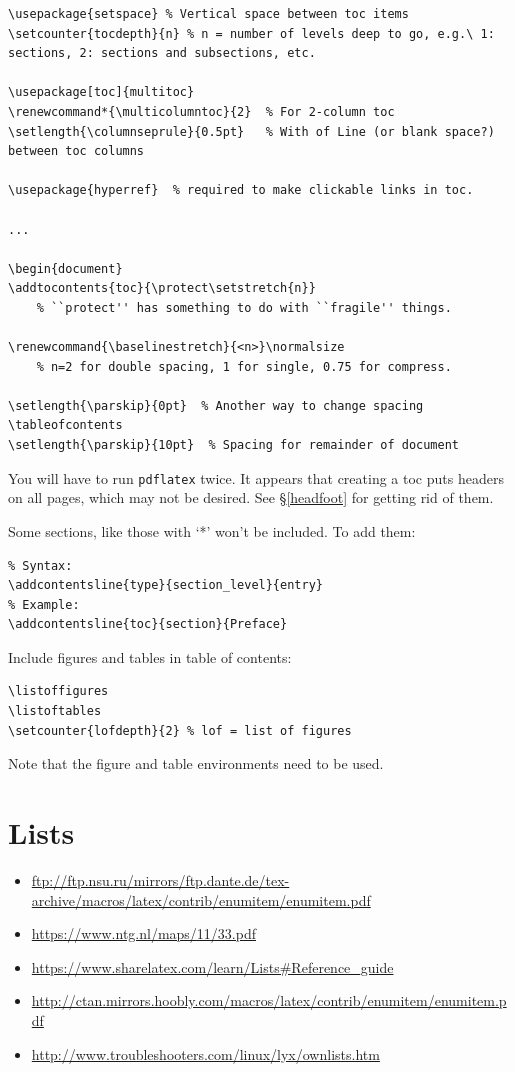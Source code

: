 \documentclass{article}
\begin{document}
\begin{lstlisting}
\usepackage{setspace} % Vertical space between toc items
\setcounter{tocdepth}{n} % n = number of levels deep to go, e.g.\ 1: sections, 2: sections and subsections, etc.

\usepackage[toc]{multitoc} 
\renewcommand*{\multicolumntoc}{2}  % For 2-column toc
\setlength{\columnseprule}{0.5pt}   % With of Line (or blank space?) between toc columns

\usepackage{hyperref}  % required to make clickable links in toc.

...

\begin{document}
\addtocontents{toc}{\protect\setstretch{n}}
    % ``protect'' has something to do with ``fragile'' things.

\renewcommand{\baselinestretch}{<n>}\normalsize
    % n=2 for double spacing, 1 for single, 0.75 for compress.

\setlength{\parskip}{0pt}  % Another way to change spacing
\tableofcontents
\setlength{\parskip}{10pt}  % Spacing for remainder of document
\end{lstlisting}

You will have to run \texttt{pdflatex} twice.
It appears that creating a toc puts headers on all pages, which may
not be desired. See \S{}\ref{headfoot} for getting rid of them.

Some sections, like those with `*' won't be included. To add them:
\begin{lstlisting}
% Syntax:
\addcontentsline{type}{section_level}{entry}
% Example:
\addcontentsline{toc}{section}{Preface}
\end{lstlisting}


Include figures and tables in table of contents:
\begin{lstlisting}
\listoffigures
\listoftables
\setcounter{lofdepth}{2} % lof = list of figures
\end{lstlisting}
Note that the figure and table environments need to be used.



\newpage
\section{Lists}
\begin{itemize}
    \item \url{ftp://ftp.nsu.ru/mirrors/ftp.dante.de/tex-archive/macros/latex/contrib/enumitem/enumitem.pdf}
    \item \url{https://www.ntg.nl/maps/11/33.pdf}
    \item \url{https://www.sharelatex.com/learn/Lists#Reference_guide}
    \item \url{http://ctan.mirrors.hoobly.com/macros/latex/contrib/enumitem/enumitem.pdf}
    \item \url{http://www.troubleshooters.com/linux/lyx/ownlists.htm}
\end{itemize}
\end{document}
